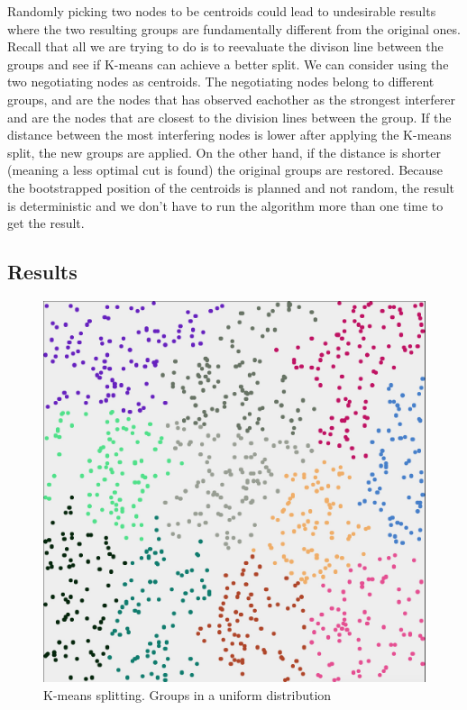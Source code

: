 Randomly picking two nodes to be centroids could lead to undesirable results where the two resulting groups are fundamentally different from the original ones. Recall that all we are trying to do is to
reevaluate the divison line between the groups and see if K-means can achieve a better split. We can consider using the two negotiating nodes as centroids. The negotiating nodes belong to different groups,
and are the nodes that has observed eachother as the strongest interferer and are the nodes that are closest to the division lines between the group. If the distance between the most interfering nodes
is lower after applying the K-means split, the new groups are applied. On the other hand, if the distance is shorter (meaning a less optimal cut is found) the original groups are restored. Because the bootstrapped
position of the centroids is planned and not random, the result is deterministic and we don't have to run the algorithm more than one time to get the result. 
%


\subsection{Results}

\begin{figure}[H]
	\center
	\includegraphics[scale=0.35]{Images/computations/KMEANS500x500_1000n.jpg}
	\caption{K-means splitting. Groups in a uniform distribution}
	\label{fig:kmeans_uniform}
\end{figure}

